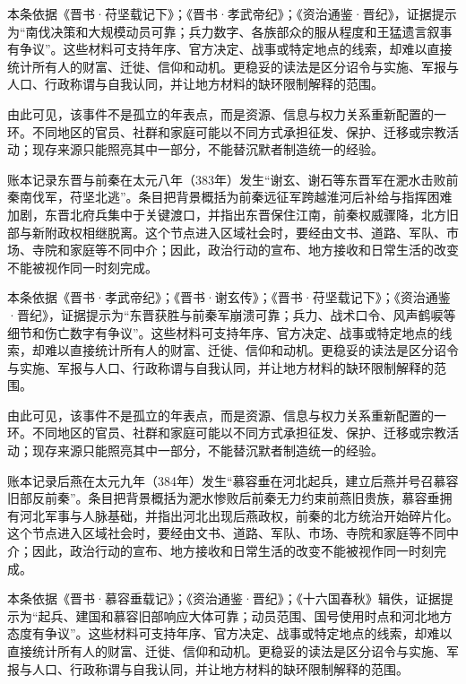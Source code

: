 本条依据《晋书·苻坚载记下》；《晋书·孝武帝纪》；《资治通鉴·晋纪》，证据提示为“南伐决策和大规模动员可靠；兵力数字、各族部众的服从程度和王猛遗言叙事有争议”。这些材料可支持年序、官方决定、战事或特定地点的线索，却难以直接统计所有人的财富、迁徙、信仰和动机。更稳妥的读法是区分诏令与实施、军报与人口、行政称谓与自我认同，并让地方材料的缺环限制解释的范围。

由此可见，该事件不是孤立的年表点，而是资源、信息与权力关系重新配置的一环。不同地区的官员、社群和家庭可能以不同方式承担征发、保护、迁移或宗教活动；现存来源只能照亮其中一部分，不能替沉默者制造统一的经验。

账本记录东晋与前秦在太元八年（383年）发生“谢玄、谢石等东晋军在淝水击败前秦南伐军，苻坚北逃”。条目把背景概括为前秦远征军跨越淮河后补给与指挥困难加剧，东晋北府兵集中于关键渡口，并指出东晋保住江南，前秦权威骤降，北方旧部与新附政权相继脱离。这个节点进入区域社会时，要经由文书、道路、军队、市场、寺院和家庭等不同中介；因此，政治行动的宣布、地方接收和日常生活的改变不能被视作同一时刻完成。

本条依据《晋书·孝武帝纪》；《晋书·谢玄传》；《晋书·苻坚载记下》；《资治通鉴·晋纪》，证据提示为“东晋获胜与前秦军崩溃可靠；兵力、战术口令、风声鹤唳等细节和伤亡数字有争议”。这些材料可支持年序、官方决定、战事或特定地点的线索，却难以直接统计所有人的财富、迁徙、信仰和动机。更稳妥的读法是区分诏令与实施、军报与人口、行政称谓与自我认同，并让地方材料的缺环限制解释的范围。

由此可见，该事件不是孤立的年表点，而是资源、信息与权力关系重新配置的一环。不同地区的官员、社群和家庭可能以不同方式承担征发、保护、迁移或宗教活动；现存来源只能照亮其中一部分，不能替沉默者制造统一的经验。

账本记录后燕在太元九年（384年）发生“慕容垂在河北起兵，建立后燕并号召慕容旧部反前秦”。条目把背景概括为淝水惨败后前秦无力约束前燕旧贵族，慕容垂拥有河北军事与人脉基础，并指出河北出现后燕政权，前秦的北方统治开始碎片化。这个节点进入区域社会时，要经由文书、道路、军队、市场、寺院和家庭等不同中介；因此，政治行动的宣布、地方接收和日常生活的改变不能被视作同一时刻完成。

本条依据《晋书·慕容垂载记》；《资治通鉴·晋纪》；《十六国春秋》辑佚，证据提示为“起兵、建国和慕容旧部响应大体可靠；动员范围、国号使用时点和河北地方态度有争议”。这些材料可支持年序、官方决定、战事或特定地点的线索，却难以直接统计所有人的财富、迁徙、信仰和动机。更稳妥的读法是区分诏令与实施、军报与人口、行政称谓与自我认同，并让地方材料的缺环限制解释的范围。

